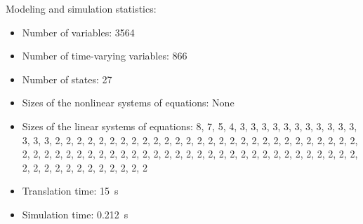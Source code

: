\begin{contextbox}
  Modeling and simulation statistics:
  \begin{itemize}
    \item Number of variables: 3564
    \item Number of time-varying variables: 866
    \item Number of states: 27
    \item Sizes of the nonlinear systems of equations: None
    \item Sizes of the linear systems of equations: 8, 7, 5, 4, 3, 3, 3, 3, 3, 3, 3, 3, 3, 3, 3, 3, 3, 3, 2, 2, 2, 2, 2, 2, 2, 2, 2, 2, 2, 2, 2, 2, 2, 2, 2, 2, 2, 2, 2, 2, 2, 2, 2, 2, 2, 2, 2, 2, 2, 2, 2, 2, 2, 2, 2, 2, 2, 2, 2, 2, 2, 2, 2, 2, 2, 2, 2, 2, 2, 2, 2, 2, 2, 2, 2, 2, 2, 2, 2, 2, 2, 2, 2, 2, 2, 2, 2, 2, 2
    \item Translation time: \SI{15}{s}
    \item Simulation time: \SI{0.212}{s}
  \end{itemize}
\end{contextbox}
